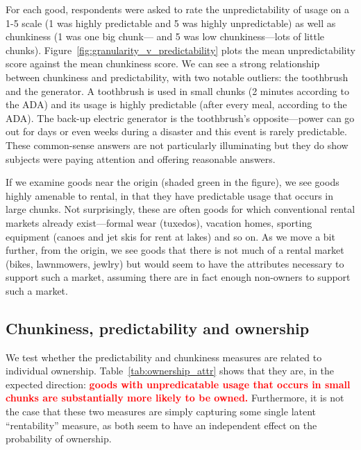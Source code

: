 \documentclass[11pt]{article}
\newcommand{\important}[1]{\textcolor{red}{\textbf{#1}}}
\newcommand{\important}[1]{#1}
\begin{document}
For each good, respondents were asked to rate the unpredictability of usage on a 1-5 scale (1 was highly predictable and 5 was highly unpredictable) as well as chunkiness (1 was one big chunk--- and 5 was low chunkiness---lots of little chunks).  
Figure~\ref{fig:granularity_v_predictability} plots the mean unpredictability score against the mean chunkiness score. 
We can see a strong relationship between chunkiness and predictability, with two notable outliers: the toothbrush and the generator. 
A toothbrush is used in small chunks (2 minutes according to the ADA) and its usage is highly predictable (after every meal, according to the ADA).
The back-up electric generator is the toothbrush's opposite---power can go out for days or even weeks during a disaster and this event is rarely predictable. 
These common-sense answers are not particularly illuminating but they do show subjects were paying attention and offering reasonable answers. 

If we examine goods near the origin (shaded green in the figure), we see goods highly amenable to rental, in that they have predictable usage that occurs in large chunks. 
Not surprisingly, these are often goods for which conventional rental markets already exist---formal wear (tuxedos), vacation homes, sporting equipment (canoes and jet skis for rent at lakes) and so on.
As we move a bit further, from the origin, we see goods that there is not much of a rental market (bikes, lawnmowers, jewlry) but would seem to have the attributes necessary to support such a market, assuming there are in fact enough non-owners to support such a market.  

\subsection{Chunkiness, predictability and ownership} 

We test whether the predictability and chunkiness measures are related to individual ownership. 
Table~\ref{tab:ownership_attr} shows that they are, in the expected direction:
\important{goods with unpredicatable usage that occurs in small chunks are substantially more likely to be owned.}
Furthermore, it is not the case that these two measures are simply capturing some single latent ``rentability'' measure, as both seem to have an independent effect on the probability of ownership. 

 
\end{document}
